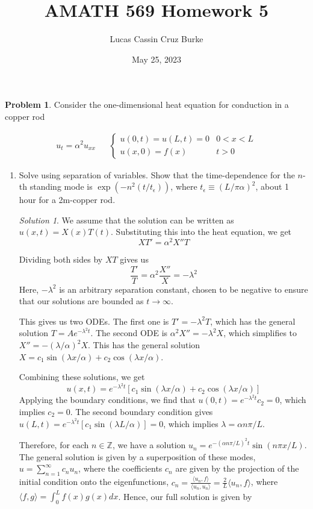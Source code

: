 \documentclass[12pt,a4paper]{article}
\title{AMATH 569 Homework 5}
\author{Lucas Cassin Cruz Burke}
\date{May 25, 2023}
\theoremstyle{definition}
\newtheorem{problem}{Problem}
\theoremstyle{remark}
\newtheorem*{solution}{Solution}
\begin{document}
\maketitle

\begin{problem}
    Consider the one-dimensional heat equation for conduction in a copper rod

    \begin{align*}
        u_t = \alpha^2 u_{xx} && \begin{cases}
            u(0, t)=u(L, t) = 0 & 0 < x < L \\
            u(x,0)=f(x) & t > 0
        \end{cases}
    \end{align*}

    \begin{enumerate}[label=(\alph*)]
        \item Solve using separation of variables. Show that the time-dependence for the $n$-th standing mode is $\exp(-n^2(t/t_\epsilon))$, where $t_\epsilon \equiv (L/\pi \alpha)^2$, about 1 hour for a 2m-copper rod.
        \begin{solution}
        We assume that the solution can be written as $u(x,t) = X(x)T(t)$. Substituting this into the heat equation, we get $$XT' = \alpha^2 X''T$$

        Dividing both sides by $XT$ gives us $$\frac{T'}{T} = \alpha^2 \frac{X''}{X} = -\lambda^2$$ Here, $-\lambda^2$ is an arbitrary separation constant, chosen to be negative to ensure that our solutions are bounded as $t \rightarrow \infty$.

        This gives us two ODEs. The first one is $T' = -\lambda^2 T$, which has the general solution $T = Ae^{-\lambda^2 t}$. The second ODE is $\alpha^2 X'' = -\lambda^2 X$, which simplifies to $X'' = -(\lambda/\alpha)^2 X$. This has the general solution $X = c_1 \sin (\lambda x/\alpha) + c_2 \cos(\lambda x/\alpha)$.

        Combining these solutions, we get $$u(x,t) = e^{-\lambda^2 t}[c_1 \sin(\lambda x/\alpha) + c_2 \cos(\lambda x/\alpha)]$$ Applying the boundary conditions, we find that $u(0,t)= e^{-\lambda^2 t} c_2 = 0$, which implies $c_2 = 0$. The second boundary condition gives $u(L,t) = e^{-\lambda^2 t} [c_1 \sin (\lambda L/\alpha)] = 0$, which implies $\lambda = \alpha n \pi / L$.

        Therefore, for each $n \in \mathbb Z$, we have a solution $u_n = e^{-(\alpha n \pi / L)^2 t} \sin (n \pi x / L)$. The general solution is given by a superposition of these modes, $u = \sum_{n=1}^\infty c_n u_n$, where the coefficients $c_n$ are given by the projection of the initial condition onto the eigenfunctions, $c_n = \frac{\langle u_n, f \rangle}{\langle u_n, u_n \rangle} = \frac{2}{L} \langle u_n, f \rangle$, where $\langle f, g \rangle = \int_0^L f(x) g(x) dx$. Hence, our full solution is given by 


\end{solution}
\end{enumerate}
\end{problem}
\end{document}
